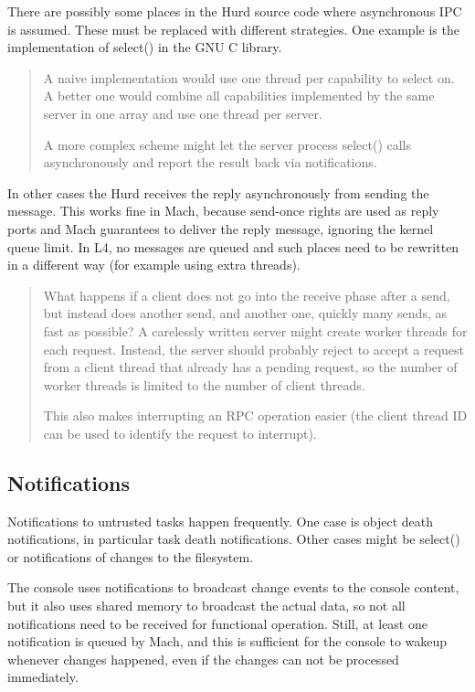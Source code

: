 \documentclass[9pt,a4paper]{extarticle}
\newenvironment{comment}{\footnotesize \begin{quote}}{\end{quote}}
\begin{document}
There are possibly some places in the Hurd source code where
asynchronous IPC is assumed.  These must be replaced with different
strategies.  One example is the implementation of select() in the GNU
C library.

\begin{comment}
  A naive implementation would use one thread per capability to select
  on.  A better one would combine all capabilities implemented by the
  same server in one array and use one thread per server.
  
  A more complex scheme might let the server process select() calls
  asynchronously and report the result back via notifications.
\end{comment}

In other cases the Hurd receives the reply asynchronously from sending
the message.  This works fine in Mach, because send-once rights are
used as reply ports and Mach guarantees to deliver the reply message,
ignoring the kernel queue limit.  In L4, no messages are queued and
such places need to be rewritten in a different way (for example using
extra threads).

\begin{comment}
  What happens if a client does not go into the receive phase after a
  send, but instead does another send, and another one, quickly many
  sends, as fast as possible?  A carelessly written server might
  create worker threads for each request.  Instead, the server should
  probably reject to accept a request from a client thread that
  already has a pending request, so the number of worker threads is
  limited to the number of client threads.
  
  This also makes interrupting an RPC operation easier (the client
  thread ID can be used to identify the request to interrupt).
\end{comment}


\subsection{Notifications}

Notifications to untrusted tasks happen frequently.  One case is
object death notifications, in particular task death notifications.
Other cases might be select() or notifications of changes to the
filesystem.

The console uses notifications to broadcast change events to the
console content, but it also uses shared memory to broadcast the
actual data, so not all notifications need to be received for
functional operation.  Still, at least one notification is queued by
Mach, and this is sufficient for the console to wakeup whenever
changes happened, even if the changes can not be processed
immediately.
  
\end{document}
